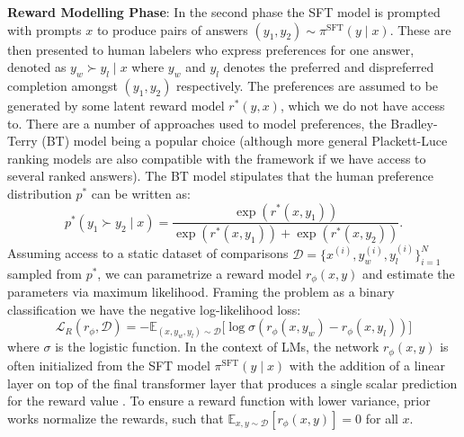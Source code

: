 \documentclass{article}
\newcommand{\pisft}{\pi^\text{SFT}} %
\begin{document}
\textbf{Reward Modelling Phase}: In the second phase the SFT model is prompted with prompts $x$ to produce pairs of answers $(y_1, y_2)\sim \pisft(y \mid x)$. These are then presented to human labelers who express preferences for one answer, denoted as $y_w\succ y_l \mid x$ where $y_w$ and $y_l$ denotes the preferred and dispreferred completion amongst $(y_1, y_2)$ respectively. The preferences are assumed to be generated by some latent reward model $r^*(y, x)$, which we do not have access to. There are a number of approaches used to model preferences, the Bradley-Terry (BT) \cite{bradley1952rankanalysis} model being a popular choice (although more general Plackett-Luce ranking models \citep{plackett1975analysis, luce2012individual} are also compatible with the framework if we have access to several ranked answers). The BT model stipulates that the human preference distribution $p^*$ can be written as:
\begin{equation}\label{eq:bradley-terry}
    p^*(y_1\succ y_2 \mid x)=\frac{\exp\left(r^*(x, y_1)\right)}{\exp\left(r^*(x, y_1)\right) + \exp\left(r^*(x, y_2)\right)}.
\end{equation}
Assuming access to a static dataset of comparisons $\mathcal{D}=\bigl\{x^{(i)}, y_w^{(i)}, y_l^{(i)}\bigr\}_{i=1}^N$ sampled from $p^*$, we can parametrize a reward model $r_{\phi}(x, y)$ and estimate the parameters via maximum likelihood. Framing the problem as a binary classification we have the negative log-likelihood loss:
\begin{equation}\label{eq:reward_model}
    \mathcal{L}_R(r_{\phi}, \mathcal{D}) = -\mathbb{E}_{(x, y_w, y_l)\sim \mathcal{D}}\bigl[\log \sigma(r_{\phi}(x, y_w)- r_{\phi}(x, y_l))\bigr]
\end{equation}
where $\sigma$ is the logistic function. In the context of LMs, the network $r_{\phi}(x, y)$ is often initialized from the SFT model $\pisft(y \mid x)$ with the addition of a linear layer on top of the final transformer layer that produces a single scalar prediction for the reward value \cite{ziegler2020finetuning}. To ensure a reward function with lower variance, prior works normalize the rewards, such that  $\mathbb{E}_{x,y\sim \mathcal{D}}\left[r_\phi(x, y)\right] = 0$ for all $x$.
\end{document}
